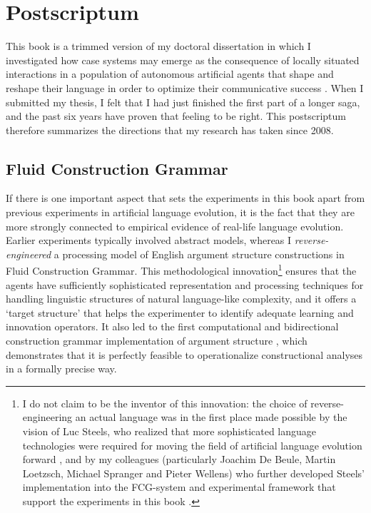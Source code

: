 \chapter*{Postscriptum}
\label{c:conclusion}

This book is a trimmed version of my doctoral dissertation in which I investigated how case systems may emerge as the consequence of locally situated interactions in a population of autonomous artificial agents that shape and reshape their language in order to optimize their communicative success \citep{vantrijp08analogy}. When I submitted my thesis, I felt that I had just finished the first part of a longer saga, and the past six years have proven that feeling to be right. This postscriptum therefore summarizes the directions that my research has taken since 2008.

\section*{Fluid Construction Grammar}

If there is one important aspect that sets the experiments in this book apart from previous experiments in artificial language evolution, it is the fact that they are more strongly connected to empirical evidence of real-life language evolution. Earlier experiments typically involved abstract models, whereas I {\em reverse-engineered} a processing model of English argument structure constructions in Fluid Construction Grammar. This methodological innovation\footnote{I do not claim to be the inventor of this innovation: the choice of reverse-engineering an actual language was in the first place made possible by the vision of Luc Steels, who realized that more sophisticated language technologies were required for moving the field of artificial language evolution forward \citep{steels04constructivist}, and by my colleagues (particularly Joachim De Beule, Martin Loetzsch, Michael Spranger and Pieter Wellens) who further developed Steels' implementation into the FCG-system and experimental framework that support the experiments in this book \citep{loetzsch:08b}.} ensures that the agents have sufficiently sophisticated representation and processing techniques for handling linguistic structures of natural language-like complexity, and it offers a `target structure' that helps the experimenter to identify adequate learning and innovation operators. It also led to the first computational and bidirectional construction grammar implementation of argument structure \citep{vantrijp08argumentsstruktur}, which demonstrates that it is perfectly feasible to operationalize constructional analyses in a formally precise way.

